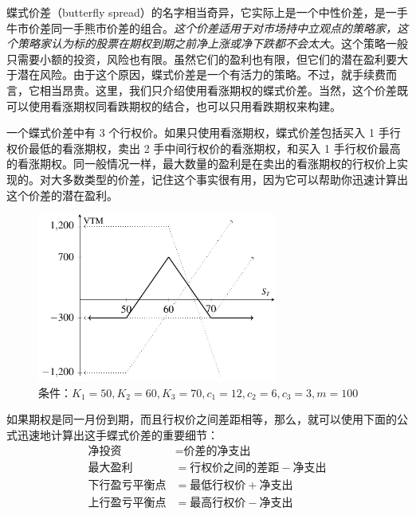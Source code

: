 \documentclass{article}
\begin{document}
蝶式价差（butterfly spread）的名字相当奇异，它实际上是一个中性价差，是一手牛市价差同一手熊市价差的组合。\textit{这个价差适用于对市场持中立观点的策略家，这个策略家认为标的股票在期权到期之前净上涨或净下跌都不会太大}。这个策略一般只需要小额的投资，风险也有限。虽然它们的盈利也有限，但它们的潜在盈利要大于潜在风险。由于这个原因，蝶式价差是一个有活力的策略。不过，就手续费而言，它相当昂贵。这里，我们只介绍使用看涨期权的蝶式价差。当然，这个价差既可以使用看涨期权同看跌期权的结合，也可以只用看跌期权来构建。

一个蝶式价差中有 3 个行权价。如果只使用看涨期权，蝶式价差包括买入 1 手行权价最低的看涨期权，卖出 2 手中间行权价的看涨期权，和买入 1 手行权价最高的看涨期权。同一般情况一样，最大数量的盈利是在卖出的看涨期权的行权价上实现的。对大多数类型的价差，记住这个事实很有用，因为它可以帮助你迅速计算出这个价差的潜在盈利。

\begin{figure}[h]
    \centering
    \includegraphics[width=0.7\textwidth]{../IMG/pngbutterflyspreads.pdf}
    \caption{条件：$K_1=50, K_2=60, K_3=70, c_1=12, c_2=6, c_3=3, m=100$}
    \label{fig:call_spread}
\end{figure}

如果期权是同一月份到期，而且行权价之间差距相等，那么，就可以使用下面的公式迅速地计算出这手蝶式价差的重要细节：
\begin{equation}
    \begin{aligned}
    \text{净投资}&=\text{价差的净支出}\\
    \text{最大盈利}&=\text{行权价之间的差距}-\text{净支出}\\
    \text{下行盈亏平衡点}&=\text{最低行权价}+\text{净支出}\\
    \text{上行盈亏平衡点}&=\text{最高行权价}-\text{净支出}\\
    \end{aligned}
\end{equation}
\end{document}
